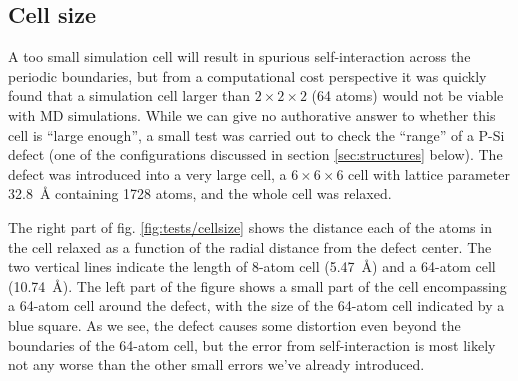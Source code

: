 \documentclass[11pt,bibliography=totoc,index=totoc]{scrbook}   %
\begin{document}





%
\subsection{Cell size}\label{sec:parameters:supercell}
%

A too small simulation cell will result in spurious self-interaction across the periodic boundaries, but from 
a computational cost perspective it was quickly found that a simulation cell larger than $2\times 2\times 2$ (64 atoms) would not be viable
with MD simulations. 
While we can give no authorative answer to whether this cell is ``large enough'', a small test was carried out to check the ``range'' of a P-Si defect (one of the configurations discussed in section \ref{sec:structures} below).
The defect was introduced into a very large cell, a $6\times 6\times 6$ cell with lattice parameter 32.8~Å containing 1728 atoms, and the whole cell was relaxed.

The right part of fig. \ref{fig:tests/cellsize} shows the distance each of the atoms in the cell relaxed as a function of the radial distance from the defect center. The two vertical lines indicate the length of 8-atom cell (5.47~Å) and a 64-atom cell (10.74~Å). 
The left part of the figure shows a small part of the cell encompassing a 64-atom cell around the defect, with the size of the 64-atom cell indicated by a blue square.
As we see, the defect causes some distortion even beyond the boundaries of the 64-atom cell, but the error from self-interaction is most likely not any worse than the other small errors we've already introduced.
\end{document}
